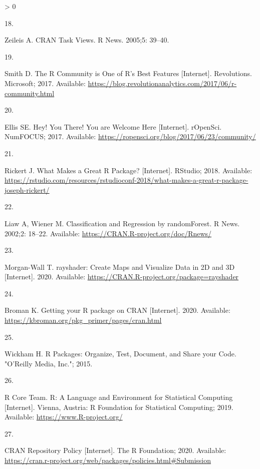 \documentclass[10pt,letterpaper]{article}
\newlength{\csllabelwidth}
\newlength{\cslhangindent}
\newenvironment{CSLReferences}[3] %
 {%
  \setlength{\parindent}{0pt}
  \ifodd #1 \everypar{\setlength{\hangindent}{\cslhangindent}}\ignorespaces\fi
  \ifnum #2 > 0
  \setlength{\parskip}{#2\baselineskip}
  \fi
 }%
 {}
\newcommand{\CSLLeftMargin}[1]{\parbox[t]{\csllabelwidth}{#1}}
\newcommand{\CSLRightInline}[1]{\parbox[t]{\linewidth - \csllabelwidth}{#1}}
\begin{document}
\begin{CSLReferences}{0}{0}
\leavevmode\hypertarget{ref-zeileis2005}{}%
\CSLLeftMargin{18. }
\CSLRightInline{Zeileis A. {CRAN Task Views}. R News. 2005;5: 39--40. }

\leavevmode\hypertarget{ref-smith2017}{}%
\CSLLeftMargin{19. }
\CSLRightInline{Smith D. {The R Community is One of R's Best Features}
{[}Internet{]}. Revolutions. Microsoft; 2017. Available:
\url{https://blog.revolutionanalytics.com/2017/06/r-community.html}}

\leavevmode\hypertarget{ref-ellis2017}{}%
\CSLLeftMargin{20. }
\CSLRightInline{Ellis SE. {Hey! You There! You are Welcome Here}
{[}Internet{]}. rOpenSci. NumFOCUS; 2017. Available:
\url{https://ropensci.org/blog/2017/06/23/community/}}

\leavevmode\hypertarget{ref-rickert2018}{}%
\CSLLeftMargin{21. }
\CSLRightInline{Rickert J. {What Makes a Great R Package?}
{[}Internet{]}. RStudio; 2018. Available:
\url{https://rstudio.com/resources/rstudioconf-2018/what-makes-a-great-r-package-joseph-rickert/}}

\leavevmode\hypertarget{ref-randomforest}{}%
\CSLLeftMargin{22. }
\CSLRightInline{Liaw A, Wiener M. {Classification and Regression by
randomForest}. R News. 2002;2: 18--22. Available:
\url{https://CRAN.R-project.org/doc/Rnews/}}

\leavevmode\hypertarget{ref-rayshader}{}%
\CSLLeftMargin{23. }
\CSLRightInline{Morgan-Wall T. {rayshader: Create Maps and Visualize
Data in 2D and 3D} {[}Internet{]}. 2020. Available:
\url{https://CRAN.R-project.org/package=rayshader}}

\leavevmode\hypertarget{ref-broman2020}{}%
\CSLLeftMargin{24. }
\CSLRightInline{Broman K. {Getting your R package on CRAN}
{[}Internet{]}. 2020. Available:
\url{https://kbroman.org/pkg_primer/pages/cran.html}}

\leavevmode\hypertarget{ref-wickham2015}{}%
\CSLLeftMargin{25. }
\CSLRightInline{Wickham H. {R Packages: Organize, Test, Document, and
Share your Code}. "O'Reilly Media, Inc."; 2015. }

\leavevmode\hypertarget{ref-baseR}{}%
\CSLLeftMargin{26. }
\CSLRightInline{R Core Team. {R: A Language and Environment for
Statistical Computing} {[}Internet{]}. Vienna, Austria: R Foundation for
Statistical Computing; 2019. Available:
\url{https://www.R-project.org/}}

\leavevmode\hypertarget{ref-cranpolicy2020}{}%
\CSLLeftMargin{27. }
\CSLRightInline{{CRAN Repository Policy} {[}Internet{]}. The R
Foundation; 2020. Available:
\url{https://cran.r-project.org/web/packages/policies.html\#Submission}}


\end{CSLReferences}
\end{document}
